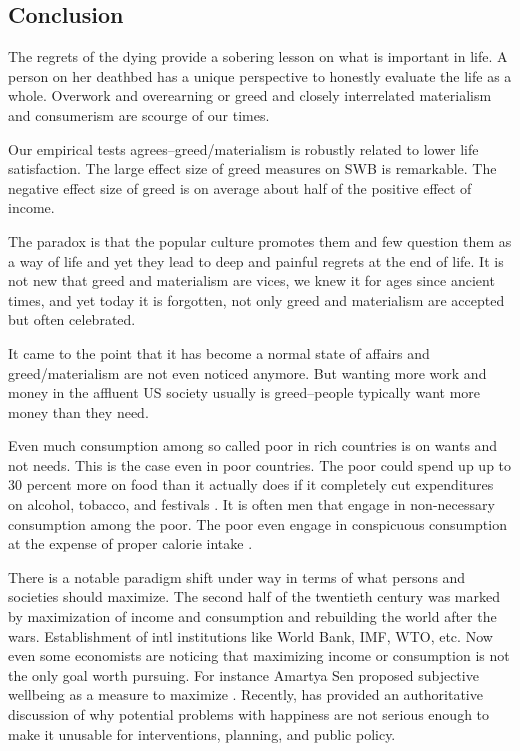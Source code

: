 \documentclass[10pt, letterpaper]{article}
\begin{document}
\begin{spacing}{1.8}
\subsection{Conclusion}

 The regrets of the dying \citep{ware12}  provide a sobering lesson on what is
 important in life. A person on her deathbed has a unique perspective to honestly
 evaluate the life as a whole. Overwork and overearning or greed and closely
 interrelated materialism and consumerism are scourge of our times.

Our empirical tests agrees--greed/materialism is
robustly related to lower life satisfaction. The large effect size of greed
measures on SWB is remarkable. The negative effect size of greed is on average about half of the positive effect of income.


 The paradox
 is that the popular culture promotes them and few question them as a way of
 life and yet they lead to deep and painful regrets at the end of life.
%
 It is not new that greed and materialism are vices, we knew it for ages since
 ancient times, and yet today it is forgotten, not only greed and materialism are
 accepted but often celebrated. 

 It came to the point that it has become a normal state of affairs and
 greed/materialism are not even noticed anymore. But wanting more work and money
 in the affluent US society usually is greed--people typically want more money
  than they need.  

Even much consumption among so called poor in rich countries is on wants and not needs. This is the case even in poor countries.
The poor could spend up up to 30 percent more on food than it actually does if
it completely cut expenditures on alcohol, tobacco, and festivals \citep{banerjee11}.
It is often men that engage in non-necessary consumption among the poor. %
The poor even engage in conspicuous consumption at the expense of proper calorie intake \citep{bellet18}. 


There is a notable paradigm shift under way in terms of what persons and
societies should maximize. The second half of the twentieth century was marked
by maximization of income and consumption and rebuilding the world after the
wars. Establishment of intl institutions like World Bank, IMF, WTO, etc. Now
even some economists are noticing that maximizing income or consumption is not
the only goal worth pursuing. For instance Amartya Sen proposed subjective
wellbeing as a measure to maximize \cite{stiglitz09al}. 
Recently, \citet{diener09} has provided an authoritative  
discussion of why potential problems with happiness are not serious
enough to make it unusable for interventions, planning, and public policy.  


\end{spacing}
\end{document}
